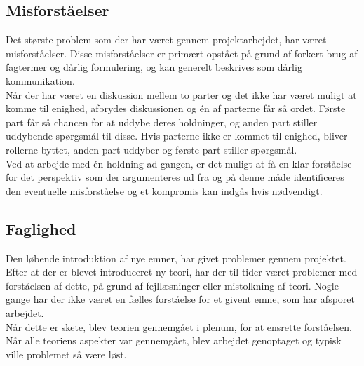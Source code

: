 \subsection{Misforståelser}
Det største problem som der har været gennem projektarbejdet, har været misforståelser. Disse misforståelser er primært opstået på grund af forkert brug af fagtermer og dårlig formulering, og kan generelt beskrives som dårlig kommunikation.\\
Når der har været en diskussion mellem to parter og det ikke har været muligt at komme til enighed, afbrydes diskussionen og én af parterne får så ordet. Første part får så chancen for at uddybe deres holdninger, og anden part stiller uddybende spørgsmål til disse. Hvis parterne ikke er kommet til enighed, bliver rollerne byttet, anden part uddyber og første part stiller spørgsmål.\\
Ved at arbejde med én holdning ad gangen, er det muligt at få en klar forståelse for det perspektiv som der argumenteres ud fra og på denne måde identificeres den eventuelle misforståelse og et kompromis kan indgås hvis nødvendigt.
\subsection{Faglighed}
Den løbende introduktion af nye emner, har givet problemer gennem projektet. Efter at der er blevet introduceret ny teori, har der til tider været problemer med forståelsen af dette, på grund af fejllæsninger eller mistolkning af teori. Nogle gange har der ikke været en fælles forståelse for et givent emne, som har afsporet arbejdet.\\
Når dette er skete, blev teorien gennemgået i plenum, for at ensrette forståelsen. Når alle teoriens aspekter var gennemgået, blev arbejdet genoptaget og typisk ville problemet så være løst.

